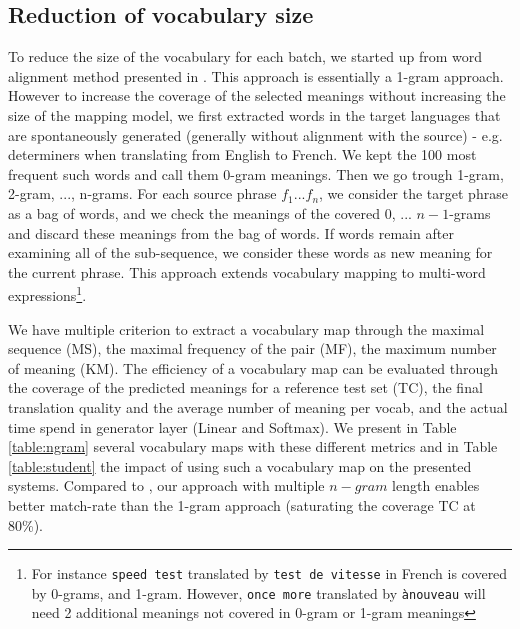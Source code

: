 \documentclass[11pt,a4paper]{article}
\begin{document}
\subsection{Reduction of vocabulary size}
To reduce the size of the vocabulary for each batch, we started up from word alignment method presented in . This approach is essentially a 1-gram approach. However to increase the coverage of the selected meanings without increasing the size of the mapping model, we first extracted words in the target languages that are spontaneously generated (generally without alignment with the source) - e.g. determiners when translating from English to French. We kept the 100 most frequent such words and call them 0-gram meanings. Then we go trough 1-gram, 2-gram, ..., n-grams. For each source phrase $f_1 ... f_n$, we consider the target phrase as a bag of words, and we check the meanings of the covered $0$, ... $n-1$-grams and discard these meanings from the bag of words. If words remain after examining all of the sub-sequence, we consider these words as new meaning for the current phrase. This approach extends vocabulary mapping to multi-word expressions\footnote{For instance {\tt speed test} translated by {\tt test de vitesse} in French is covered by 0-grams, and 1-gram. However, {\tt once more} translated by {\tt ànouveau} will need 2 additional meanings not covered in 0-gram or 1-gram meanings}. 

We have multiple criterion to extract a vocabulary map through the maximal sequence (MS), the maximal frequency of the pair (MF), the maximum number of meaning (KM). The efficiency of a vocabulary map can be evaluated through the coverage of the predicted meanings  for a reference test set (TC), the final translation quality and the average number of meaning per vocab, and the actual time spend in generator layer (Linear and Softmax).
We present in Table \ref{table:ngram} several vocabulary maps with these different metrics and in Table \ref{table:student} the impact of using such a vocabulary map on the presented systems. Compared to , our approach with multiple $n-gram$ length enables better match-rate than the 1-gram approach (saturating the coverage TC at 80\%).
\end{document}
